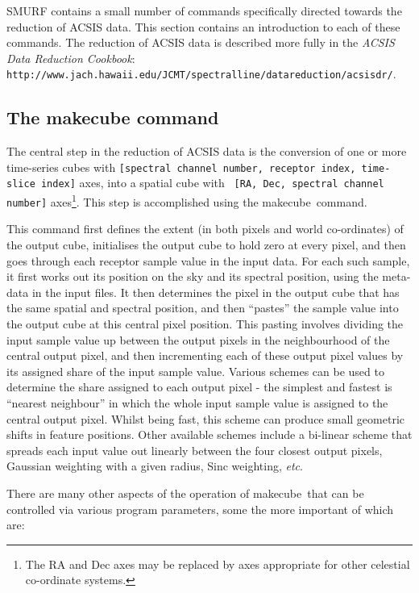 \documentclass[twoside,11pt]{article}
\newcommand{\htmladdnormallink}[2]{#1}
\newcommand{\xref}[3]{#1}
\renewcommand{\_}{\texttt{\symbol{95}}}
\newcommand{\task}[1]{\textsf{#1}}
\newcommand{\makecube}{\xref{\task{makecube}}{sun258}{MAKECUBE}}
\begin{document}
SMURF contains a small number of commands specifically directed towards
the reduction of ACSIS data. This section contains an introduction to
each of these commands. The reduction of ACSIS data is described
more fully in the {\em ACSIS Data Reduction Cookbook}:
\htmladdnormallink{\texttt{http://www.jach.hawaii.edu/JCMT/spectral\_line/data\_reduction/acsisdr/}}
{http://www.jach.hawaii.edu/JCMT/spectral_line/data_reduction/acsisdr/}.

\subsection{The makecube command}

The central step in the reduction of ACSIS data is the conversion of one
or more time-series cubes with {\tt [spectral channel number, receptor
index, time-slice index]} axes, into a spatial cube with {\tt
[RA, Dec, spectral channel number]} axes\footnote{The RA and Dec axes may
be replaced by axes appropriate for other celestial co-ordinate
systems.}. This step is accomplished using the \makecube\ command.

This command first defines the extent (in both pixels and world
co-ordinates) of the output cube, initialises the output cube to hold
zero at every pixel, and then goes through each receptor sample value in
the input data. For each such sample, it first works out its position on
the sky and its spectral position, using the meta-data in the input
files. It then determines the pixel in the output cube that has the same
spatial and spectral position, and then ``pastes'' the sample value into
the output cube at this central pixel position. This pasting involves
dividing the input sample value up between the output pixels in the
neighbourhood of the central output pixel, and then incrementing each of
these output pixel values by its assigned share of the input sample
value. Various schemes can be used to determine the share assigned to each
output pixel - the simplest and fastest is ``nearest neighbour'' in which
the whole input sample value is assigned to the central output pixel.
Whilst being fast, this scheme can produce small geometric shifts in
feature positions. Other available schemes include a bi-linear scheme
that spreads each input value out linearly between the four closest
output pixels, Gaussian weighting with a given radius, Sinc weighting,
{\em etc}.

There are many other aspects of the operation of \makecube\ that can be
controlled via various program parameters, some the more important of
which are:
\end{document}
